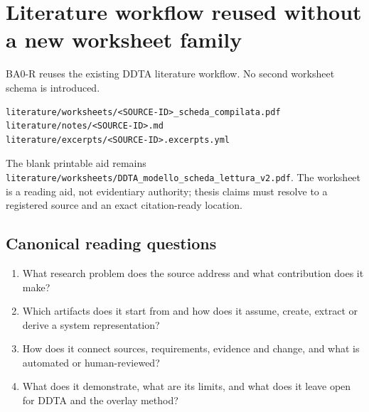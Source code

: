 \documentclass[11pt,a4paper]{article}
\begin{document}
\section{Literature workflow reused without a new worksheet family}
BA0-R reuses the existing DDTA literature workflow. No second worksheet schema is introduced.
\begin{lstlisting}
literature/worksheets/<SOURCE-ID>_scheda_compilata.pdf
literature/notes/<SOURCE-ID>.md
literature/excerpts/<SOURCE-ID>.excerpts.yml
\end{lstlisting}
The blank printable aid remains \texttt{literature/worksheets/DDTA\_modello\_scheda\_lettura\_v2.pdf}. The worksheet is a reading aid, not evidentiary authority; thesis claims must resolve to a registered source and an exact citation-ready location.

\subsection{Canonical reading questions}
\begin{enumerate}
\item What research problem does the source address and what contribution does it make?
\item Which artifacts does it start from and how does it assume, create, extract or derive a system representation?
\item How does it connect sources, requirements, evidence and change, and what is automated or human-reviewed?
\item What does it demonstrate, what are its limits, and what does it leave open for DDTA and the overlay method?
\end{enumerate}
\end{document}
